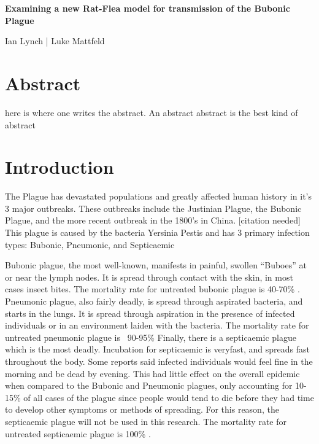 \documentclass [letterpaper, 12pt] {article}
\begin{document}
	\begin{titlepage}
	\centering
	\vspace*{\fill}

	\vspace*{0.5cm}

	\huge\bfseries
	Examining a new Rat-Flea model for transmission of the Bubonic Plague
	
	\vspace*{0.5cm}

	\large Ian Lynch | Luke Mattfeld

	\vspace*{\fill}
	\end{titlepage}

\tableofcontents
\newpage
{}

\section {Abstract}

here is where one writes the abstract. An abstract abstract is the best kind of abstract
\pagebreak

\section {Introduction}

The Plague has devastated populations and greatly affected human history in it’s 3 major outbreaks. These outbreaks include the Justinian Plague, the Bubonic Plague, and the more recent outbreak in the 1800’s in China. [citation needed]
This plague is caused by the bacteria Yersinia Pestis and has 3 primary infection types: Bubonic, Pneumonic, and Septicaemic

Bubonic plague, the most well-known, manifests in painful, swollen “Buboes” at or near the lymph nodes. It is spread through contact with the skin, in most cases insect bites. The mortality rate for untreated bubonic plague is 40-70\% \cite{ditchburn_hodgkins_2019} . Pneumonic plague, also fairly deadly, is spread through aspirated bacteria, and starts in the lungs. It is spread through aspiration in the presence of infected individuals or in an environment laiden with the bacteria. The mortality rate for untreated pneumonic plague is ~90-95\% Finally, there is a septicaemic plague which is the most deadly. Incubation for septicaemic is veryfast, and spreads fast throughout the body. Some reports said infected individuals would feel fine in the morning and be dead by evening. This had little effect on the overall epidemic when compared to the Bubonic and Pneumonic plagues, only accounting for 10-15\% of all cases of the plague since people would tend to die before they had time to develop other symptoms or methods of spreading. For this reason, the septicaemic plague will not be used in this research. The mortality rate for untreated septicaemic plague is 100\% \cite{ditchburn_hodgkins_2019}.
\end{document}
